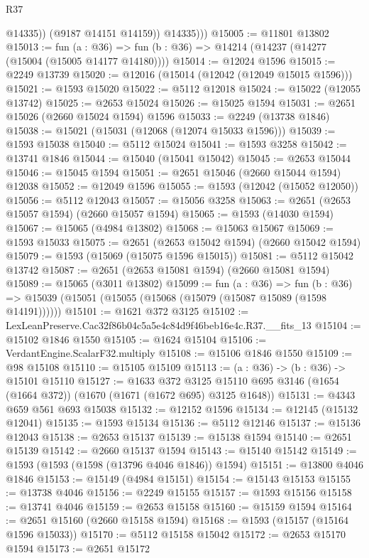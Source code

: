 \begin{lexlean}{R37}
\begin{coremodule}
                @14335))
            (@9187 @14151 @14159))
          @14335)))
@15005 := @11801 @13802
@15013 := fun (a : @36) => fun (b : @36) => @14214 (@14237 (@14277 (@15004 (@15005 @14177 @14180))))
@15014 := @12024 @1596
@15015 := @2249 @13739
@15020 := @12016 (@15014 (@12042 (@12049 @15015 @1596)))
@15021 := @1593 @15020
@15022 := @5112 @12018
@15024 := @15022 (@12055 @13742)
@15025 := @2653 @15024
@15026 := @15025 @1594
@15031 := @2651 @15026 (@2660 @15024 @1594) @1596
@15033 := @2249 (@13738 @1846)
@15038 := @15021 (@15031 (@12068 (@12074 @15033 @1596)))
@15039 := @1593 @15038
@15040 := @5112 @15024
@15041 := @1593 @3258
@15042 := @13741 @1846
@15044 := @15040 (@15041 @15042)
@15045 := @2653 @15044
@15046 := @15045 @1594
@15051 := @2651 @15046 (@2660 @15044 @1594) @12038
@15052 := @12049 @1596
@15055 := @1593 (@12042 (@15052 @12050))
@15056 := @5112 @12043
@15057 := @15056 @3258
@15063 := @2651 (@2653 @15057 @1594) (@2660 @15057 @1594)
@15065 := @1593 (@14030 @1594)
@15067 := @15065 (@4984 @13802)
@15068 := @15063 @15067
@15069 := @1593 @15033
@15075 := @2651 (@2653 @15042 @1594) (@2660 @15042 @1594)
@15079 := @1593 (@15069 (@15075 @1596 @15015))
@15081 := @5112 @15042 @13742
@15087 := @2651 (@2653 @15081 @1594) (@2660 @15081 @1594)
@15089 := @15065 (@3011 @13802)
@15099 := fun (a : @36) =>
  fun (b : @36) => @15039 (@15051 (@15055 (@15068 (@15079 (@15087 @15089 (@1598 @14191))))))
@15101 := @1621 @372 @3125
@15102 := LexLeanPreserve.Cac32f86b04c5a5e4c84d9f46beb16e4c.R37.__fits_13
@15104 := @15102 @1846 @1550
@15105 := @1624 @15104
@15106 := VerdantEngine.ScalarF32.multiply
@15108 := @15106 @1846 @1550
@15109 := @98 @15108
@15110 := @15105 @15109
@15113 := (a : @36) -> (b : @36) -> @15101 @15110
@15127 := @1633
    @372
    @3125
    @15110
    @695
    @3146
    (@1654 (@1664 @372))
    (@1670 (@1671 (@1672 @695) @3125 @1648))
@15131 := @4343 @659 @561 @693 @15038
@15132 := @12152 @1596
@15134 := @12145 (@15132 @12041)
@15135 := @1593 @15134
@15136 := @5112 @12146
@15137 := @15136 @12043
@15138 := @2653 @15137
@15139 := @15138 @1594
@15140 := @2651 @15139
@15142 := @2660 @15137 @1594
@15143 := @15140 @15142
@15149 := @1593 (@1593 (@1598 (@13796 @4046 @1846)) @1594)
@15151 := @13800 @4046 @1846
@15153 := @15149 (@4984 @15151)
@15154 := @15143 @15153
@15155 := @13738 @4046
@15156 := @2249 @15155
@15157 := @1593 @15156
@15158 := @13741 @4046
@15159 := @2653 @15158
@15160 := @15159 @1594
@15164 := @2651 @15160 (@2660 @15158 @1594)
@15168 := @1593 (@15157 (@15164 @1596 @15033))
@15170 := @5112 @15158 @15042
@15172 := @2653 @15170 @1594
@15173 := @2651 @15172

\end{coremodule}
\end{lexlean}
